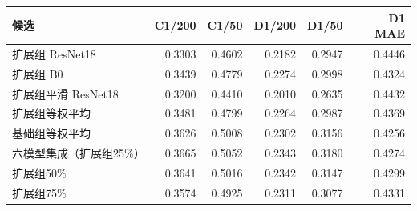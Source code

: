 \begin{tabular}{lrrrrr}
\toprule
候选 & C1/200 & C1/50 & D1/200 & D1/50 & D1 MAE \\
\midrule
扩展组 ResNet18 & 0.3303 & 0.4602 & 0.2182 & 0.2947 & 0.4446 \\
扩展组 B0 & 0.3439 & 0.4779 & 0.2274 & 0.2998 & 0.4324 \\
扩展组平滑 ResNet18 & 0.3200 & 0.4410 & 0.2010 & 0.2635 & 0.4432 \\
扩展组等权平均 & 0.3481 & 0.4799 & 0.2264 & 0.2987 & 0.4369 \\
基础组等权平均 & 0.3626 & 0.5008 & 0.2302 & 0.3156 & 0.4256 \\
六模型集成（扩展组25\%） & 0.3665 & 0.5052 & 0.2343 & 0.3180 & 0.4274 \\
扩展组50\% & 0.3641 & 0.5016 & 0.2342 & 0.3147 & 0.4299 \\
扩展组75\% & 0.3574 & 0.4925 & 0.2311 & 0.3077 & 0.4331 \\
\bottomrule
\end{tabular}